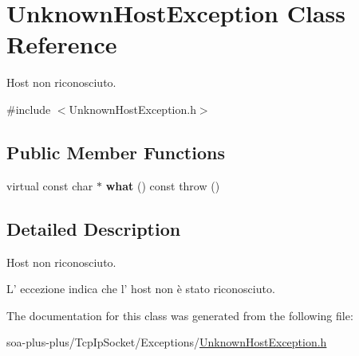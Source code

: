 \hypertarget{class_unknown_host_exception}{
\section{UnknownHostException Class Reference}
\label{class_unknown_host_exception}
}


Host non riconosciuto.  




{\ttfamily \#include $<$UnknownHostException.h$>$}

\subsection*{Public Member Functions}
\begin{DoxyCompactItemize}
\item 
\hypertarget{class_unknown_host_exception_a7efe0a5bd8bc49b3f3d5ac94e4f12dbc}{
virtual const char $\ast$ {\bfseries what} () const   throw ()}
\label{class_unknown_host_exception_a7efe0a5bd8bc49b3f3d5ac94e4f12dbc}

\end{DoxyCompactItemize}


\subsection{Detailed Description}
Host non riconosciuto. 

L' eccezione indica che l' host non è stato riconosciuto. 

The documentation for this class was generated from the following file:\begin{DoxyCompactItemize}
\item 
soa-\/plus-\/plus/TcpIpSocket/Exceptions/\hyperlink{_unknown_host_exception_8h}{UnknownHostException.h}\end{DoxyCompactItemize}
